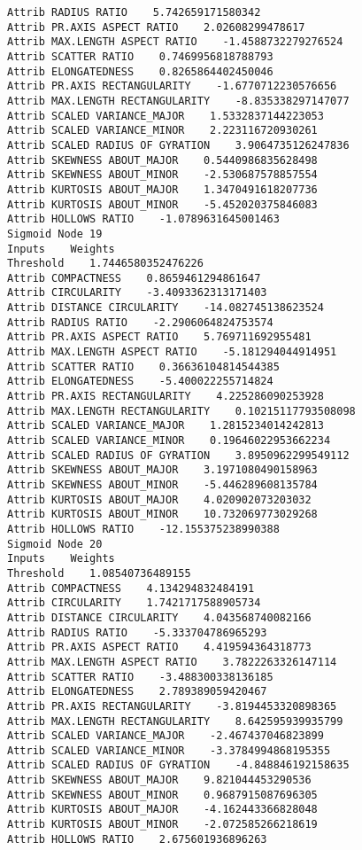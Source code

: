\documentclass[
	article,			%
	11pt,				%
	oneside,			%
	a4paper,			%
	english,			%
	brazil,				%
	sumario=tradicional
	]{abntex2}
\begin{document}
\begin{lstlisting}
Attrib RADIUS RATIO    5.742659171580342
Attrib PR.AXIS ASPECT RATIO    2.02608299478617
Attrib MAX.LENGTH ASPECT RATIO    -1.4588732279276524
Attrib SCATTER RATIO    0.7469956818788793
Attrib ELONGATEDNESS    0.8265864402450046
Attrib PR.AXIS RECTANGULARITY    -1.6770712230576656
Attrib MAX.LENGTH RECTANGULARITY    -8.835338297147077
Attrib SCALED VARIANCE_MAJOR    1.5332837144223053
Attrib SCALED VARIANCE_MINOR    2.223116720930261
Attrib SCALED RADIUS OF GYRATION    3.9064735126247836
Attrib SKEWNESS ABOUT_MAJOR    0.5440986835628498
Attrib SKEWNESS ABOUT_MINOR    -2.530687578857554
Attrib KURTOSIS ABOUT_MAJOR    1.3470491618207736
Attrib KURTOSIS ABOUT_MINOR    -5.452020375846083
Attrib HOLLOWS RATIO    -1.0789631645001463
Sigmoid Node 19
Inputs    Weights
Threshold    1.7446580352476226
Attrib COMPACTNESS    0.8659461294861647
Attrib CIRCULARITY    -3.4093362313171403
Attrib DISTANCE CIRCULARITY    -14.082745138623524
Attrib RADIUS RATIO    -2.2906064824753574
Attrib PR.AXIS ASPECT RATIO    5.769711692955481
Attrib MAX.LENGTH ASPECT RATIO    -5.181294044914951
Attrib SCATTER RATIO    0.36636104814544385
Attrib ELONGATEDNESS    -5.400022255714824
Attrib PR.AXIS RECTANGULARITY    4.225286090253928
Attrib MAX.LENGTH RECTANGULARITY    0.10215117793508098
Attrib SCALED VARIANCE_MAJOR    1.2815234014242813
Attrib SCALED VARIANCE_MINOR    0.19646022953662234
Attrib SCALED RADIUS OF GYRATION    3.8950962299549112
Attrib SKEWNESS ABOUT_MAJOR    3.1971080490158963
Attrib SKEWNESS ABOUT_MINOR    -5.446289608135784
Attrib KURTOSIS ABOUT_MAJOR    4.020902073203032
Attrib KURTOSIS ABOUT_MINOR    10.732069773029268
Attrib HOLLOWS RATIO    -12.155375238990388
Sigmoid Node 20
Inputs    Weights
Threshold    1.08540736489155
Attrib COMPACTNESS    4.134294832484191
Attrib CIRCULARITY    1.7421717588905734
Attrib DISTANCE CIRCULARITY    4.043568740082166
Attrib RADIUS RATIO    -5.333704786965293
Attrib PR.AXIS ASPECT RATIO    4.419594364318773
Attrib MAX.LENGTH ASPECT RATIO    3.7822263326147114
Attrib SCATTER RATIO    -3.488300338136185
Attrib ELONGATEDNESS    2.789389059420467
Attrib PR.AXIS RECTANGULARITY    -3.8194453320898365
Attrib MAX.LENGTH RECTANGULARITY    8.642595939935799
Attrib SCALED VARIANCE_MAJOR    -2.467437046823899
Attrib SCALED VARIANCE_MINOR    -3.3784994868195355
Attrib SCALED RADIUS OF GYRATION    -4.848846192158635
Attrib SKEWNESS ABOUT_MAJOR    9.821044453290536
Attrib SKEWNESS ABOUT_MINOR    0.9687915087696305
Attrib KURTOSIS ABOUT_MAJOR    -4.162443366828048
Attrib KURTOSIS ABOUT_MINOR    -2.072585266218619
Attrib HOLLOWS RATIO    2.675601936896263

\end{lstlisting}
\end{document}
